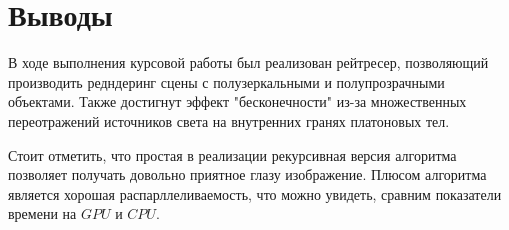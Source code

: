 \section{Выводы}
В ходе выполнения курсовой работы был реализован рейтресер, позволяющий производить редндеринг сцены с полузеркальными и полупрозрачными объектами. Также достигнут эффект "бесконечности" из-за множественных переотражений источников света на внутренних гранях платоновых тел.

Стоит отметить, что простая в реализации рекурсивная версия алгоритма позволяет получать довольно приятное глазу изображение. Плюсом алгоритма является хорошая распарллеливаемость, что можно увидеть, сравним показатели времени на $GPU$ и $CPU$.
\pagebreak
